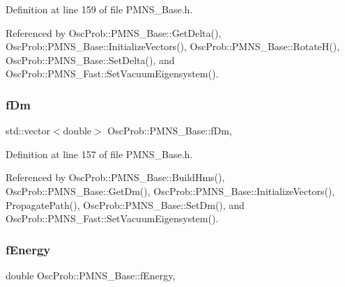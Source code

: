 Definition at line 159 of file P\+M\+N\+S\+\_\+\+Base.\+h.



Referenced by Osc\+Prob\+::\+P\+M\+N\+S\+\_\+\+Base\+::\+Get\+Delta(), Osc\+Prob\+::\+P\+M\+N\+S\+\_\+\+Base\+::\+Initialize\+Vectors(), Osc\+Prob\+::\+P\+M\+N\+S\+\_\+\+Base\+::\+Rotate\+H(), Osc\+Prob\+::\+P\+M\+N\+S\+\_\+\+Base\+::\+Set\+Delta(), and Osc\+Prob\+::\+P\+M\+N\+S\+\_\+\+Fast\+::\+Set\+Vacuum\+Eigensystem().

\mbox{\label{classOscProb_1_1PMNS__Base_a406a31c3b5d620e5a0cace5b411f9f70}} 
\subsubsection{\texorpdfstring{f\+Dm}{fDm}}
{\footnotesize\ttfamily std\+::vector$<$double$>$ Osc\+Prob\+::\+P\+M\+N\+S\+\_\+\+Base\+::f\+Dm\hspace{0.3cm}{\ttfamily [protected]}, {\ttfamily [inherited]}}



Definition at line 157 of file P\+M\+N\+S\+\_\+\+Base.\+h.



Referenced by Osc\+Prob\+::\+P\+M\+N\+S\+\_\+\+Base\+::\+Build\+Hms(), Osc\+Prob\+::\+P\+M\+N\+S\+\_\+\+Base\+::\+Get\+Dm(), Osc\+Prob\+::\+P\+M\+N\+S\+\_\+\+Base\+::\+Initialize\+Vectors(), Propagate\+Path(), Osc\+Prob\+::\+P\+M\+N\+S\+\_\+\+Base\+::\+Set\+Dm(), and Osc\+Prob\+::\+P\+M\+N\+S\+\_\+\+Fast\+::\+Set\+Vacuum\+Eigensystem().

\mbox{\label{classOscProb_1_1PMNS__Base_a2800af6d436972f3e900867790c046b0}} 
\subsubsection{\texorpdfstring{f\+Energy}{fEnergy}}
{\footnotesize\ttfamily double Osc\+Prob\+::\+P\+M\+N\+S\+\_\+\+Base\+::f\+Energy\hspace{0.3cm}{\ttfamily [protected]}, {\ttfamily [inherited]}}



